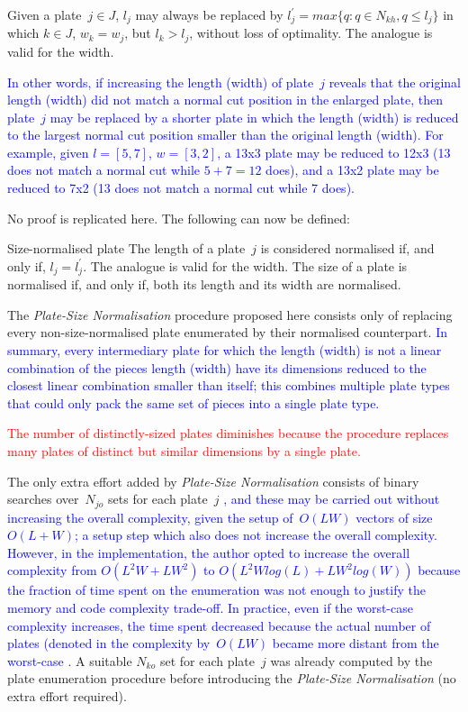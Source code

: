 \documentclass[ppgc,tese,english,formais,babel]{iiufrgs}
\newif\iffinalversion
\newcommand{\newtext}[1]{\iffinalversion%
#1%
\else%
\textcolor{blue}{#1}%
\fi%
}
\newcommand{\oldtext}[1]{\iffinalversion%
\else%
\textcolor{red}{#1}%
\fi%
}
\begin{document}
\begin{proposition}
\label{pro:normalisation}
Given a plate~\(j \in J\), \(l_j\) may always be replaced by \(l^\prime_j = max\{q : q \in N_{kh}, q \leq l_j\}\) in which \(k \in J\), \(w_k = w_j\), but \(l_k > l_j\), without loss of optimality.
The analogue is valid for the width.
\end{proposition}

\newtext{In other words, if increasing the length (width) of plate~\(j\) reveals that the original length (width) did not match a normal cut position in the enlarged plate, then plate~\(j\) may be replaced by a shorter plate in which the length (width) is reduced to the largest normal cut position smaller than the original length (width). For example, given \(l = [5, 7]\), \(w = [3, 2]\), a 13x3 plate may be reduced to 12x3 (13 does not match a normal cut while \(5 + 7 = 12\) does), and a 13x2 plate may be reduced to 7x2 (13 does not match a normal cut while 7 does).}
No proof is replicated here. The following can now be defined:

\begin{definition}{Size-normalised plate}
The length of a plate~\(j\) is considered normalised if, and only if, \(l_j = l^\prime_j\).
The analogue is valid for the width.
The size of a plate is normalised if, and only if, both its length and its width are normalised.
\end{definition}

The \emph{Plate-Size Normalisation} procedure proposed here consists only of replacing every non-size-normalised plate enumerated by their normalised counterpart.
\newtext{In summary, every intermediary plate for which the length (width) is not a linear combination of the pieces length (width) have its dimensions reduced to the closest linear combination smaller than itself; this combines multiple plate types that could only pack the same set of pieces into a single plate type.}
\oldtext{The number of distinctly-sized plates diminishes because the procedure replaces many plates of distinct but similar dimensions by a single plate.}
The only extra effort added by \emph{Plate-Size Normalisation} consists of binary searches over~\(N_{jo}\) sets for each plate~\(j\)\newtext{, and these may be carried out without increasing the overall complexity, given the setup of~\(O(LW)\) vectors of size \(O(L + W)\); a setup step which also does not increase the overall complexity. However, in the implementation, the author opted to increase the overall complexity from \(O(L^2W + LW^2)\) to \(O(L^2Wlog(L) + LW^2log(W))\) because the fraction of time spent on the enumeration was not enough to justify the memory and code complexity trade-off. In practice, even if the worst-case complexity increases, the time spent decreased because the actual number of plates (denoted in the complexity by~\(O(LW)\) became more distant from the worst-case}.
A suitable \(N_{ko}\) set for each plate~\(j\) was already computed by the plate enumeration procedure before introducing the \emph{Plate-Size Normalisation} (no extra effort required).
\end{document}
